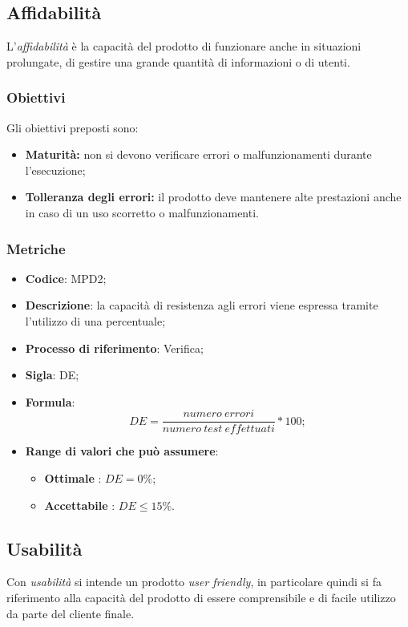 \subsection{Affidabilità}
L'\textit{affidabilità} è la capacità del prodotto di funzionare anche in situazioni prolungate, di gestire una grande quantità di informazioni o di utenti.
\subsubsection{Obiettivi}
Gli obiettivi preposti sono:
\begin {itemize}
	\item \textbf{Maturità:} non si devono verificare errori o malfunzionamenti durante l'esecuzione;
	\item \textbf{Tolleranza degli errori:} il prodotto deve mantenere alte prestazioni anche in caso di un uso scorretto o malfunzionamenti.
\end{itemize}
\subsubsection{Metriche}
\vspace{-1cm}
\begin{itemize}
	\item \textbf{Codice}: MPD2;
	\item \textbf{Descrizione}: la capacità di resistenza agli errori viene espressa tramite l'utilizzo di una percentuale;
	\item \textbf{Processo di riferimento}: Verifica;
	\item \textbf{Sigla}: DE;
	\item \textbf{Formula}: \[DE=\frac{numero \ errori}{numero \ test \ effettuati}\ast100;\]
	\item \textbf{Range di valori che può assumere}: 
		\begin{itemize}
			\item \textbf{Ottimale} : $DE = 0 \%$;
			\item \textbf{Accettabile} : $DE \leq 15 \%$.
		\end{itemize}
\end{itemize}

\subsection{Usabilità}
Con \textit{usabilità} si intende un prodotto \textit{user friendly}, in particolare quindi si fa riferimento alla capacità del prodotto di essere comprensibile e di facile utilizzo da parte del cliente finale.


